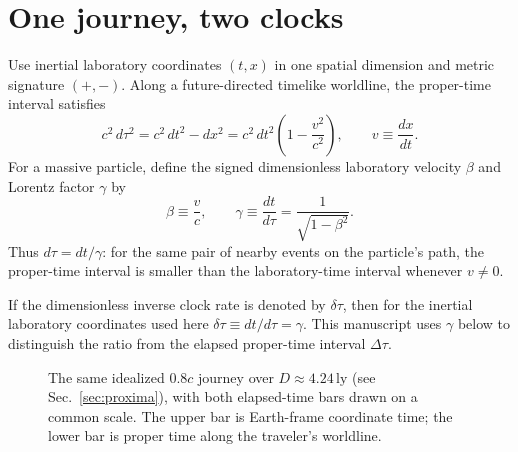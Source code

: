 \documentclass[12pt]{article}
\begin{document}
\section{One journey, two clocks}
\label{sec:kinematics}

Use inertial laboratory coordinates $(t,x)$ in one spatial dimension and metric signature $(+,-)$. Along a future-directed timelike worldline, the proper-time interval satisfies
\begin{equation}
  c^2\,d\tau^2=c^2\,dt^2-dx^2
  =c^2\,dt^2\left(1-\frac{v^2}{c^2}\right),
  \qquad v\equiv\frac{dx}{dt}.
  \label{eq:proper-time}
\end{equation}
For a massive particle, define the signed dimensionless laboratory velocity $\beta$ and Lorentz factor $\gamma$ by
\begin{equation}
  \beta\equiv\frac{v}{c},
  \qquad
  \gamma\equiv\frac{dt}{d\tau}
  =\frac{1}{\sqrt{1-\beta^2}}.
  \label{eq:beta-gamma}
\end{equation}
Thus $d\tau=dt/\gamma$: for the same pair of nearby events on the particle's path, the proper-time interval is smaller than the laboratory-time interval whenever $v\ne0$.

If the dimensionless inverse clock rate is denoted by $\delta\tau$, then for the inertial laboratory coordinates used here $\delta\tau\equiv dt/d\tau=\gamma$. This manuscript uses $\gamma$ below to distinguish the ratio from the elapsed proper-time interval $\Delta\tau$.

\begin{figure}[ht]
  \centering
  \caption{The same idealized $0.8c$ journey over $D\approx4.24\,\mathrm{ly}$ (see Sec.~\ref{sec:proxima}), with both elapsed-time bars drawn on a common scale. The upper bar is Earth-frame coordinate time; the lower bar is proper time along the traveler's worldline.}
  \label{fig:two-clocks}
\end{figure}
\end{document}
